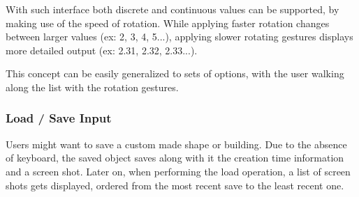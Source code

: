 With such interface both discrete and continuous values can be supported, by making use of the speed of rotation.
While applying faster rotation changes between larger values (ex: 2, 3, 4, 5...), applying slower rotating
gestures displays more detailed output (ex: 2.31, 2.32, 2.33...).

This concept can be easily generalized to sets of options, with the user walking along the list with the rotation gestures.


\subsubsection{Load / Save Input}


Users might want to save a custom made shape or building. Due to the absence of keyboard, the saved object
saves along with it the creation time information and a screen shot.
Later on, when performing the load operation, a list of screen shots gets displayed, ordered from the most
recent save to the least recent one.

